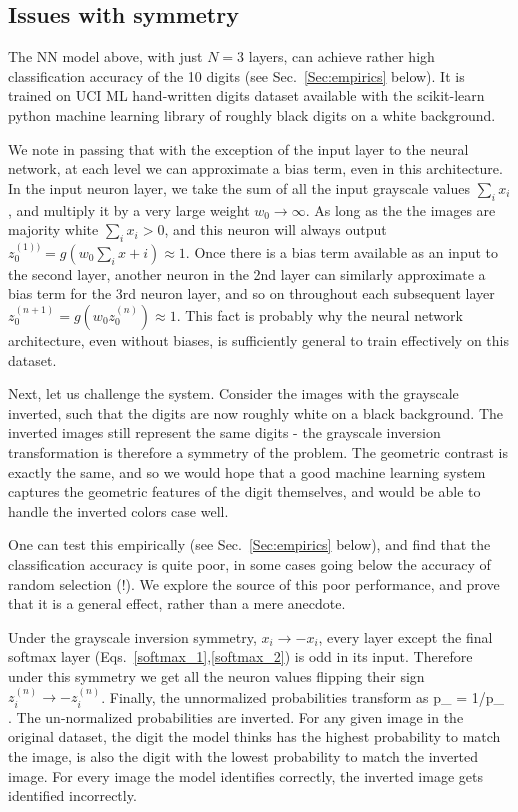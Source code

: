 \documentclass[twocolumn, prl, nofootinbib]{revtex4-1}
\begin{document}
\subsection{Issues with symmetry}

The NN model above, with just $N=3$ layers, can achieve rather high classification accuracy of the 10 digits (see Sec.~\ref{Sec:empirics} below).
It is trained on UCI ML hand-written digits dataset available with the scikit-learn python machine learning library\cite{scikit-learn} of roughly black digits on a white background.

We note in passing that with the exception of the input layer to the neural network, at each level we can approximate a bias term, even in this architecture. In the input neuron layer, we take the sum of all the input grayscale values $\sum_i x_i$, and multiply it by a very large weight $w_0 \rightarrow \infty$. As long as the the images are majority white $\sum_i x_i > 0$, and this neuron will always output $z_0^{(1))} = g\left( w_0 \sum_i x+i \right)\approx 1$. Once there is a bias term available as an input to the second layer, another neuron in the 2nd layer can similarly approximate a bias term for the 3rd neuron layer, and so on throughout each subsequent layer $z_0^{(n+1)} = g\left( w_0 z_0^{(n)} \right)\approx 1$. This fact is probably why the neural network architecture, even without biases, is sufficiently general to train effectively on this dataset.

Next, let us challenge the system. Consider the images with the grayscale inverted, such that the digits are now roughly white on 
a black background. The inverted images still represent the same digits - the grayscale inversion transformation is therefore a symmetry of the problem. The geometric contrast is exactly the same, and so we would hope that a good machine learning system captures the geometric features of the digit themselves, and would be able to handle the inverted colors case well.

One can test this empirically (see Sec.~\ref{Sec:empirics} below), and find that the classification accuracy is quite poor, in some cases going below the accuracy of random selection (!). We explore the source of this poor performance, and prove that it is a general effect, rather than a mere anecdote.

Under the grayscale inversion symmetry, $x_i \rightarrow - x_i$, every layer except the final softmax layer (Eqs.~\eqref{softmax_1},\eqref{softmax_2}) is odd in its 
input. Therefore under this symmetry we get all the neuron values flipping their sign $z^{(n)}_i \rightarrow - z^{(n)}_i$. Finally, the unnormalized probabilities transform as
\be
{\tilde p}_{\alpha} \rightarrow \exp{} = 1/{\tilde p}_{\alpha}
\; .
\ee
The un-normalized probabilities are inverted. For any given image in the original dataset, the digit the model thinks has the highest probability to match the image, is also the digit with the lowest probability to match the inverted image. For every image the model identifies correctly, the inverted image gets identified incorrectly.
\end{document}
